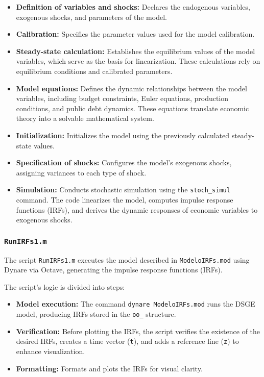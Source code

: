 \documentclass[12pt]{article}
\begin{document}
\begin{itemize}
    \item \textbf{Definition of variables and shocks:} Declares the endogenous variables, exogenous shocks, and parameters of the model.
    \item \textbf{Calibration:} Specifies the parameter values used for the model calibration.
    \item \textbf{Steady-state calculation:} Establishes the equilibrium values of the model variables, which serve as the basis for linearization. These calculations rely on equilibrium conditions and calibrated parameters.
    \item \textbf{Model equations:} Defines the dynamic relationships between the model variables, including budget constraints, Euler equations, production conditions, and public debt dynamics. These equations translate economic theory into a solvable mathematical system.
    \item \textbf{Initialization:} Initializes the model using the previously calculated steady-state values.
    \item \textbf{Specification of shocks:} Configures the model's exogenous shocks, assigning variances to each type of shock.
    \item \textbf{Simulation:} Conducts stochastic simulation using the \texttt{stoch\_simul} command. The code linearizes the model, computes impulse response functions (IRFs), and derives the dynamic responses of economic variables to exogenous shocks.
\end{itemize}


\subsubsection{\texttt{RunIRFs1.m}}

The script \texttt{RunIRFs1.m} executes the model described in \texttt{ModeloIRFs.mod} using Dynare via Octave, generating the impulse response functions (IRFs).

The script's logic is divided into steps:

\begin{itemize}
    \item \textbf{Model execution:} The command \texttt{dynare ModeloIRFs.mod} runs the DSGE model, producing IRFs stored in the \texttt{oo\_} structure.
    \item \textbf{Verification:} Before plotting the IRFs, the script verifies the existence of the desired IRFs, creates a time vector (\texttt{t}), and adds a reference line (\texttt{z}) to enhance visualization.
    \item \textbf{Formatting:} Formats and plots the IRFs for visual clarity.
\end{itemize}
\end{document}
